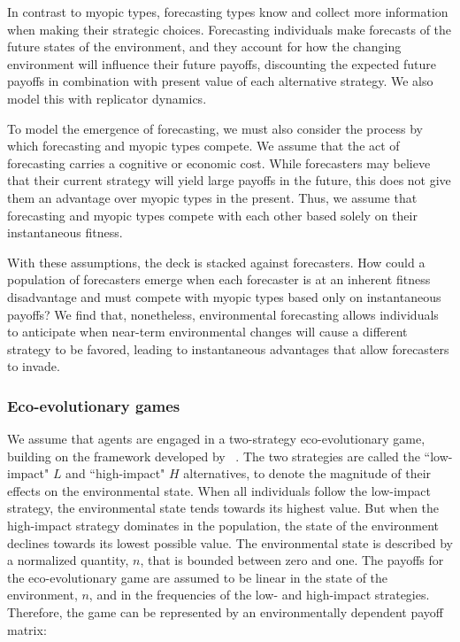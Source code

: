 \documentclass{article}
\begin{document}
In contrast to myopic types, forecasting types know and collect more information when making their strategic choices. Forecasting individuals make forecasts of the future states of the environment, and they account for how the changing environment will influence their future payoffs, discounting the expected future payoffs in combination with present value of each alternative strategy. We also model this with replicator dynamics. 

To model the emergence of forecasting, we must also consider the process by which forecasting and myopic types compete. We assume that the act of forecasting carries a cognitive or economic cost. While forecasters may believe that their current strategy will yield large payoffs in the future, this does not give them an advantage over myopic types in the present. Thus, we assume that forecasting and myopic types compete with each other based solely on their instantaneous fitness.  

With these assumptions, the deck is stacked against forecasters. How could a population of forecasters emerge when each forecaster is at an inherent fitness disadvantage and must compete with myopic types based only on instantaneous payoffs? We find that, nonetheless, environmental forecasting allows individuals to anticipate when near-term environmental changes will cause a different strategy to be favored, leading to instantaneous advantages that allow forecasters to invade.

\subsubsection*{Eco-evolutionary games}
We assume that agents are engaged in a two-strategy eco-evolutionary game, building on the  framework developed by ~\cite{tilman2020}. The two strategies are called the ``low-impact" $L$ and ``high-impact" $H$ alternatives, to denote the magnitude of their effects on the environmental state. When all individuals follow the low-impact strategy, the environmental state tends towards its highest value. But when the high-impact strategy dominates in the population, the state of the environment declines towards its lowest possible value. The environmental state is described by a normalized quantity, $n$, that is bounded between zero and one. The payoffs for the eco-evolutionary game are assumed to be linear in the state of the environment, $n$, and in the frequencies of the low- and high-impact strategies. Therefore, the game can be represented by an environmentally dependent payoff matrix:
\end{document}
